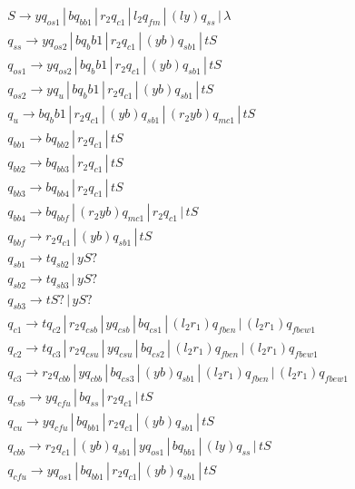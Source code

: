 \documentclass{article}
\begin{document}
\begin{mylist}
\begin{align*}
&S \rightarrow yq_{os1} \, | \, bq_{bb1} \, | \, r_2q_{c1} \, | \, l_2q_{fm} \, | \, (ly)q_{ss} \, | \, \lambda \\
&q_{ss} \rightarrow yq_{os2} \, | \, b{q_bb1} \, | \, r_2q_{c1} \, | \, (yb)q_{sb1} \, | \, tS\\
&q_{os1} \rightarrow yq_{os2} \, | \, b{q_bb1} \, | \, r_2q_{c1} \, | \, (yb)q_{sb1} \, | \, tS\\
&q_{os2} \rightarrow yq_{u} \, | \, b{q_bb1} \, | \, r_2q_{c1} \, | \, (yb)q_{sb1} \, | \, tS\\
&q_{u} \rightarrow b{q_bb1} \, | \, r_2q_{c1} \, | \,(yb)q_{sb1} \, | \, (r_2yb)q_{mc1} \, | \, tS\\
&q_{bb1} \rightarrow bq_{bb2} \, | \, r_2q_{c1} \, | \, tS \\ 
&q_{bb2} \rightarrow bq_{bb3} \, | \, r_2q_{c1} \, | \, tS \\ 
&q_{bb3} \rightarrow bq_{bb4} \, | \, r_2q_{c1} \, | \, tS \\ 
&q_{bb4} \rightarrow bq_{bbf} \, | \, (r_2yb)q_{mc1} \, | \, r_2q_{c1} \, | \, tS \\ 
&q_{bbf} \rightarrow r_2q_{c1} \, | \, (yb)q_{sb1} \, | \, tS \\ 
&q_{sb1} \rightarrow tq_{sb2} \, | \, yS? \\ 
&q_{sb2} \rightarrow tq_{sb3} \, | \, yS? \\ 
&q_{sb3} \rightarrow tS? \, | \, yS? \\ 
&q_{c1} \rightarrow tq_{c2} \, | \,  r_2q_{csb} \, | \, yq_{csb} \, | \, bq_{cs1} \, | \, (l_2r_1)q_{fben} \, | \, (l_2r_1)q_{fbew1}\\ 
&q_{c2} \rightarrow tq_{c3} \, | \,  r_2q_{csu} \, | \, yq_{csu} \, | \, bq_{cs2} \, | \, (l_2r_1)q_{fben} \, | \, (l_2r_1)q_{fbew1}\\ 
&q_{c3} \rightarrow r_2q_{cbb} \, | \,  yq_{cbb} \, | \, bq_{cs3} \, | \, (yb)q_{sb1} \, | \, (l_2r_1)q_{fben} \, | \, (l_2r_1)q_{fbew1}\ \\ 
&q_{csb} \rightarrow yq_{cfu} \, | \,  bq_{ss} \, | \, r_2q_{c1} \, | \, tS \\ 
&q_{cu} \rightarrow yq_{cfu} \, | \,  bq_{bb1} \, | \, r_2q_{c1} \, | \, (yb)q_{sb1} \, | \, tS \\ 
&q_{cbb} \rightarrow r_2q_{c1} \, | \,  (yb)q_{sb1} \, | \, yq_{os1} \, | \, bq_{bb1} \, | \, (ly)q_{ss} \, | \, tS \\ 
&q_{cfu} \rightarrow yq_{os1} \, | \,  bq_{bb1} \, | \, r_2q_{c1} | \, (yb)q_{sb1} \, | \, tS\\ 

\end{align*}
\end{mylist}
\end{document}
